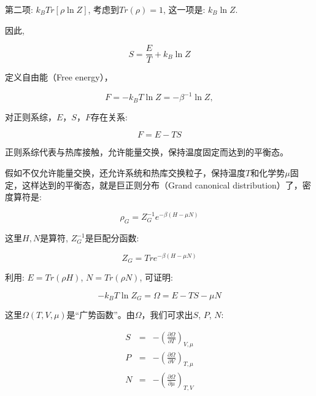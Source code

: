 第二项: $k_B Tr [ \rho \ln Z  ]$, 考虑到$Tr (\rho) = 1$, 这一项是: $k_B \ln Z$.

因此,

\begin{equation*}
S = \frac{E}{T} + k_B \ln Z
\end{equation*}

定义自由能（Free energy），

\begin{equation}\label{definition of free energy}
F = - k_B T \ln Z = - \beta^{-1} \ln Z,
\end{equation}

对正则系综，$E$，$S$，$F$存在关系:

\begin{equation}\label{relation ESF}
F = E - TS
\end{equation}

正则系综代表与热库接触，允许能量交换，保持温度固定而达到的平衡态。

假如不仅允许能量交换，还允许系统和热库交换粒子，保持温度$T$和化学势$\mu$固定，这样达到的平衡态，就是巨正则分布（Grand
canonical distribution）了，密度算符是:

\begin{equation}\label{density operator: GCE}
\rho_G = Z_G^{-1} e^{-\beta (H - \mu N)}
\end{equation}

这里$H, N$是算符, $Z_G^{-1}$是巨配分函数:

\begin{equation*}
Z_G = Tr e^{-\beta (H - \mu N)}
\end{equation*}

利用: $E = Tr (\rho H)$, $N = Tr (\rho N)$, 可证明:

\begin{equation*}
-k_B T \ln Z_G = \Omega = E- TS - \mu N
\end{equation*}

这里$\Omega(T,V,\mu)$是“广势函数”。由$\Omega$，我们可求出$S$, $P$, $N$:

\begin{eqnarray*}
  S &=& -\left( \frac{\partial \Omega}{\partial T}\right)_{V, \mu} \\
  P &=& -\left( \frac{\partial \Omega}{\partial V} \right)_{T, \mu} \\
  N &=& -\left( \frac{\partial \Omega}{\partial \mu} \right)_{T, V}
\end{eqnarray*}

